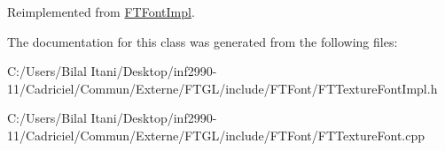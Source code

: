 Reimplemented from \hyperlink{class_f_t_font_impl}{F\+T\+Font\+Impl}.



The documentation for this class was generated from the following files\+:\begin{DoxyCompactItemize}
\item 
C\+:/\+Users/\+Bilal Itani/\+Desktop/inf2990-\/11/\+Cadriciel/\+Commun/\+Externe/\+F\+T\+G\+L/include/\+F\+T\+Font/F\+T\+Texture\+Font\+Impl.\+h\item 
C\+:/\+Users/\+Bilal Itani/\+Desktop/inf2990-\/11/\+Cadriciel/\+Commun/\+Externe/\+F\+T\+G\+L/include/\+F\+T\+Font/F\+T\+Texture\+Font.\+cpp\end{DoxyCompactItemize}
